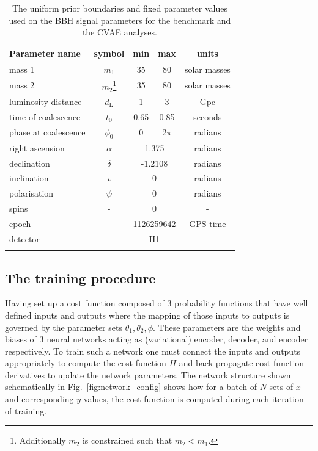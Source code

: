 \documentclass[%
showpacs,
 amsmath,amssymb,
 aps,
 twocolumn,
 prl,
 reprint,
floatfix,
]{revtex4-1}
\begin{document}
%
%
\begin{table}
\centering
\caption{The uniform prior boundaries and fixed parameter values used on the \ac{BBH} signal parameters for the benchmark
and the \ac{CVAE} analyses.}
\begin{tabular}[t]{lcccc}
\toprule
Parameter name & symbol & min & max & units \\
\hline
mass 1 & $m_1$ & 35 & 80 & solar masses \\
mass 2 & $m_2$\footnote{Additionally $m_2$ is constrained such that
$m_{2}<m_{1}$.} & 35 & 80 & solar masses \\
luminosity distance & $d_{\text{L}}$ & 1 & 3 & Gpc \\
time of coalescence & $t_{0}$ & 0.65 & 0.85 & seconds \\
phase at coalescence & $\phi_{0}$ & 0 & $2\pi$ & radians \\
\hline
right ascension & $\alpha$ & \multicolumn{2}{c}{1.375} & radians \\
declination & $\delta$ & \multicolumn{2}{c}{-1.2108} & radians \\
inclination & $\iota$ & \multicolumn{2}{c}{0} & radians \\
polarisation & $\psi$ & \multicolumn{2}{c}{0} & radians \\
spins & - & \multicolumn{2}{c}{0} & - \\
epoch & - & \multicolumn{2}{c}{1126259642} & GPS time \\
detector & - & \multicolumn{2}{c}{H1} & - \\
\botrule
\end{tabular}
\label{tab:prior_ranges}
\end{table}

\subsection{The training procedure}
%
%
Having set up a cost function composed of 3 probability functions that have
well defined inputs and outputs where the mapping of those inputs to outputs is
governed by the parameter sets $\theta_{1},\theta_{2},\phi$. These parameters
are the weights and biases of 3 neural networks acting as (variational)
encoder, decoder, and encoder respectively. To train such a network one must
connect the inputs and outputs appropriately to compute the cost function $H$
and back-propagate cost function derivatives to update the network parameters.
The network structure shown schematically in Fig.~\ref{fig:network_config}
shows how for a batch of $N$ sets of $x$ and corresponding $y$ values, the cost
function is computed during each iteration of training. 
\end{document}
